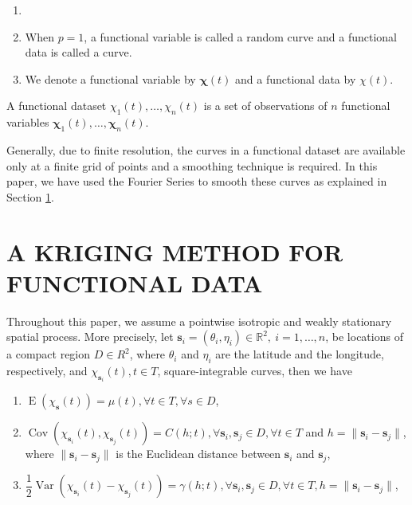 \documentclass[12pt,]{article}
\DeclareMathOperator{\vari}{Var}
\DeclareMathOperator{\espe}{E}
\DeclareMathOperator{\cov}{Cov}
\theoremstyle{definition}
\theoremstyle{definition}
\theoremstyle{definition}
\theoremstyle{remark}
\let\BeginKnitrBlock\begin \let\EndKnitrBlock\end
\begin{document}
\BeginKnitrBlock{remark}
{}

\begin{enumerate}
  \item[]
  \item When $p = 1$, a functional variable is called a random curve and a functional data is called a curve.
  \item We denote a functional variable by $\bm{\chi}(t)$ and a functional data by $\chi(t)$.
\end{enumerate}
\EndKnitrBlock{remark}

\BeginKnitrBlock{definition}
\protect\hypertarget{def:unnamed-chunk-3}{}{\label{def:unnamed-chunk-3} }A functional dataset \(\chi_1(t), \dots, \chi_n(t)\) is a set of observations of \(n\) functional variables \(\bm{\chi}_1(t), \dots, \bm{\chi}_n(t)\).
\EndKnitrBlock{definition}

Generally, due to finite resolution, the curves in a functional dataset are available only at a finite grid of points and a smoothing technique is required.
In this paper, we have used the Fourier Series to smooth these curves as explained in Section \ref{sec:kriging}.

\hypertarget{sec:kriging}{%
\section{A KRIGING METHOD FOR FUNCTIONAL DATA}\label{sec:kriging}}

Throughout this paper, we assume a pointwise isotropic and weakly stationary spatial process. More precisely, let \(\bm{s}_i = (\theta_i, \eta_i) \in \mathbb{R}^2,\ i = 1, \dots, n\), be locations of a compact region \(D \in R^2\), where \(\theta_i\) and \(\eta_i\) are the latitude and the longitude, respectively, and \(\chi_{\bm{s}_i}(t), t \in T\), square-integrable curves, then we have

\begin{enumerate}
    \item $\espe (\chi_{\bm{s}}(t)) = \mu(t), \forall t \in T, \forall s \in D$,
    \item $\cov(\chi_{\bm{s}_i}(t), \chi_{\bm{s}_j}(t)) = C(h;t), \forall \bm{s}_i, \bm{s}_j \in D, \forall t \in T$ and
    $h = \lVert\bm{s}_i -\bm{s}_j\rVert$, where $\lVert\bm{s}_i -\bm{s}_j\rVert$ is the Euclidean distance between $\bm{s}_i$ and $\bm{s}_j$,
    \item $\dfrac{1}{2}\vari(\chi_{\bm{s}_i}(t)-\chi_{\bm{s}_j}(t))= \gamma(h;t), \forall \bm{s}_i, \bm{s}_j \in D, \forall t \in T, h = \lVert\bm{s}_i-\bm{s}_j\rVert$,
\end{enumerate}
\end{document}
